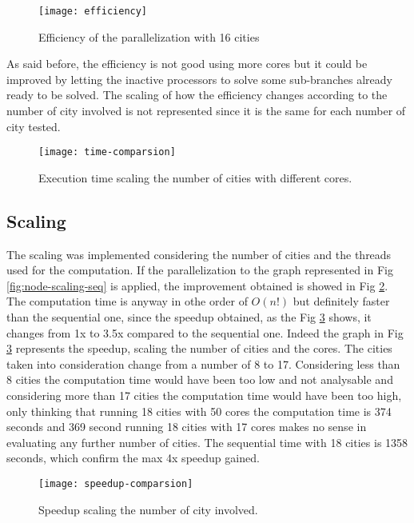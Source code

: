 \documentclass[11pt,conference]{IEEEtran}
\begin{document}
\begin{figure}[h!]
  \centering
    \texttt{[image: efficiency]}
    \caption{Efficiency of the parallelization with 16 cities}
    \label{fig:efficiency}
\end{figure}

As said before, the efficiency is not good using more cores but it could be improved by letting the inactive processors to solve some sub-branches already ready to be solved.
\newline
The scaling of how the efficiency changes according to the number of city involved is not represented since it is the same for each number of city tested.

\begin{figure}[h!]
  \centering
    \texttt{[image: time-comparsion]}
    \caption{Execution time scaling the number of cities with different cores.}
    \label{fig:time-comparsion}
\end{figure}

\subsection{Scaling}
The scaling was implemented considering the number of cities and the threads used for the computation.
\newline
If the parallelization to the graph represented in Fig \ref{fig:node-scaling-seq} is applied, the improvement obtained is showed in Fig \ref{fig:time-comparsion}. The computation time is anyway in othe order of $O(n!)$ but definitely faster than the sequential one, since the speedup obtained, as the Fig \ref{fig:speedup-comparsion} shows, it changes from 1x to 3.5x compared to the sequential one. Indeed the graph in Fig \ref{fig:speedup-comparsion} represents the speedup, scaling the number of cities and the cores. The cities taken into consideration change from a number of 8 to 17. Considering less than 8 cities the computation time would have been too low and not analysable and considering more than 17 cities the computation time would have been too high, only thinking that running 18 cities with 50 cores the computation time is 374 seconds and 369 second running 18 cities with 17 cores makes no sense in evaluating any further number of cities. The sequential time with 18 cities is 1358 seconds, which confirm the max 4x speedup gained.

\begin{figure}[h!]
  \centering
    \texttt{[image: speedup-comparsion]}
    \caption{Speedup scaling the number of city involved.}
    \label{fig:speedup-comparsion}
\end{figure}
\fi
\end{document}
